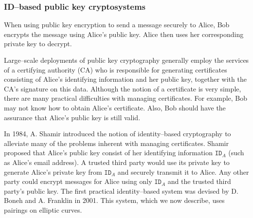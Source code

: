 \documentclass[9pt]{article}
\theoremstyle{definition}
\begin{document}
\subsubsection{ID--based public key cryptosystems}
When using public key encryption to send a message securely to Alice, Bob encrypts the message using Alice's public key. Alice then uses her corresponding private key to decrypt.

Large--scale deployments of public key cryptography generally employ the services of a certifying authority (CA) who is responsible for generating certificates consisting of Alice's identifying information and her public key, together with the CA's signature on this data. Although the notion of a certificate is very simple, there are many practical difficulties with managing certificates. For example, Bob may not know how to obtain Alice’s certificate. Also, Bob should have the assurance that Alice’s public key is still valid.

In 1984, A. Shamir introduced the notion of identity--based cryptography to alleviate many of the problems inherent with managing certificates. Shamir proposed that Alice's public key consist of her identifying information $\texttt{ID}_A$ (such as Alice's email address). A trusted third party would use its private key to
generate Alice's private key from $\texttt{ID}_A$ and securely transmit it to Alice. Any other party could encrypt messages for Alice using only $\texttt{ID}_A$ and the trusted third party's public key. The first practical identity--based system was devised by D. Boneh and A. Franklin in 2001. This system, which we now describe, uses pairings on elliptic curves.
\end{document}

